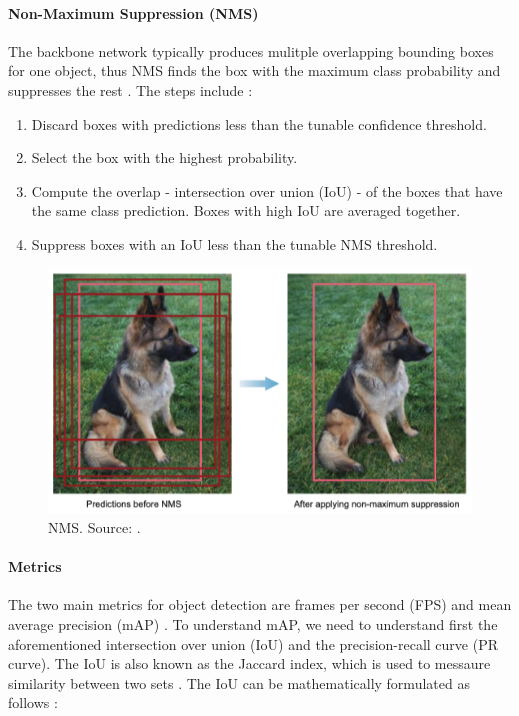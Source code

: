 \documentclass[a4paper, 11pt, oneside]{article}
\begin{document}
  \paragraph{Non-Maximum Suppression (NMS)}

  The backbone network typically produces mulitple overlapping bounding boxes for one object, thus NMS finds
  the box with the maximum class probability and suppresses the rest \cite{elgendy2020deep}. The steps include
  \cite{elgendy2020deep}:

  \begin{enumerate}
    \item Discard boxes with predictions less than the tunable confidence threshold.
    \item Select the box with the highest probability.
    \item Compute the overlap - intersection over union (IoU) - of the boxes that have the same class prediction.
    Boxes with high IoU are averaged together.
    \item Suppress boxes with an IoU less than the tunable NMS threshold.
  \end{enumerate}

  \begin{figure}[ht]
    \begin{center}
      \includegraphics[width=.8\textwidth]{nms.png}
    \end{center}
    \caption{NMS. Source: \cite{elgendy2020deep}.}
  \end{figure}

  \paragraph{Metrics}

  The two main metrics for object detection are frames per second (FPS) and mean average precision (mAP)
  \cite{elgendy2020deep, liu2020deep, geron2019hands, planche2019hands}. To understand mAP, we need to understand first
  the aforementioned intersection over union (IoU) and the precision-recall curve (PR curve). The IoU is also known as
  the Jaccard index, which is used to messaure similarity between two sets \cite{planche2019hands}. The IoU can be
  mathematically formulated as follows \cite{elgendy2020deep, planche2019hands}:
\end{document}
